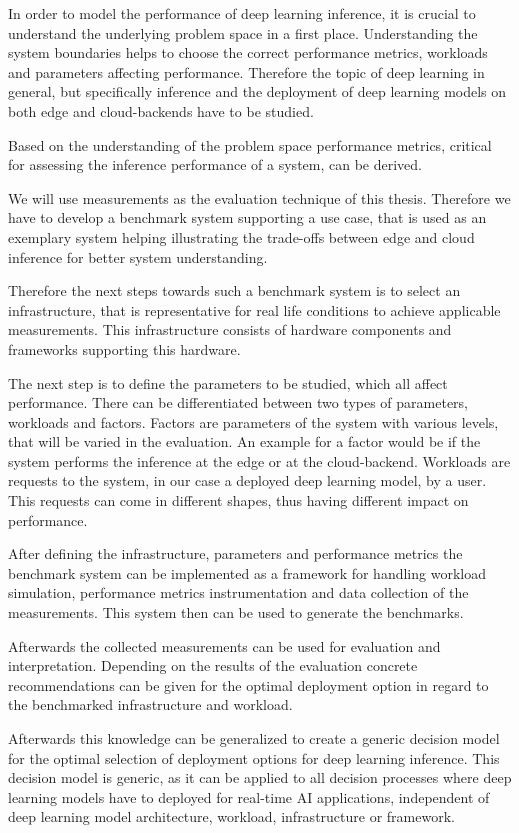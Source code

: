 In order to model the performance of deep learning inference, it is crucial to understand the underlying problem space in a first place.
Understanding the system boundaries helps to choose the correct performance metrics, workloads and parameters affecting performance.
Therefore the topic of deep learning in general, but specifically inference and the deployment of deep learning models on both edge and cloud-backends have to be studied.

Based on the understanding of the problem space performance metrics, critical for assessing the inference performance of a system, can be derived.

We will use measurements as the evaluation technique of this thesis. 
Therefore we have to develop a benchmark system supporting a use case, that is used as an exemplary system helping illustrating the trade-offs between edge and cloud inference for better system understanding.

Therefore the next steps towards such a benchmark system is to select an infrastructure, that is representative for real life conditions to achieve applicable measurements. 
This infrastructure consists of hardware components and frameworks supporting this hardware. 

The next step is to define the parameters to be studied, which all affect performance.
There can be differentiated between two types of parameters, workloads and factors.
Factors are parameters of the system with various levels, that will be varied in the evaluation. An example for a factor would be if the system performs the inference at the edge or at the cloud-backend.
Workloads are requests to the system, in our case a deployed deep learning model, by a user.
This requests can come in different shapes, thus having different impact on performance.



After defining the infrastructure, parameters and performance metrics the benchmark system can be implemented as a framework for handling workload simulation, performance metrics instrumentation and data collection of the measurements.
This system then can be used to generate the benchmarks. 

Afterwards the collected measurements can be used for evaluation and interpretation.
Depending on the results of the evaluation concrete recommendations can be given for the optimal deployment option in regard to the benchmarked infrastructure and workload.

Afterwards this knowledge can be generalized to create a generic decision model for the optimal selection of deployment options for deep learning inference.
This decision model is generic, as it can be applied to all decision processes where deep learning models have to deployed for real-time AI applications, independent of deep learning model architecture, workload, infrastructure or framework.




